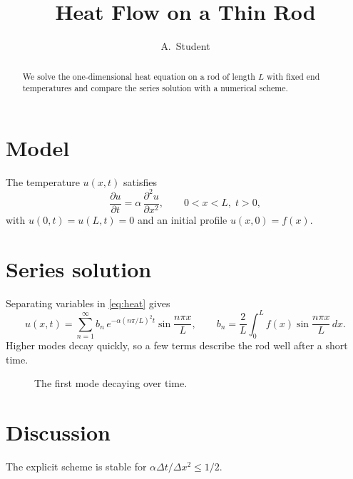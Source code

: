 \documentclass[11pt]{article}
\title{Heat Flow on a Thin Rod}
\author{A.\ Student}
\date{}
\begin{document}
\maketitle

\begin{abstract}
We solve the one-dimensional heat equation on a rod of length $L$ with fixed end temperatures
and compare the series solution with a numerical scheme.
\end{abstract}

\section{Model}
The temperature $u(x,t)$ satisfies
\begin{equation}
  \frac{\partial u}{\partial t} = \alpha \, \frac{\partial^2 u}{\partial x^2},
  \qquad 0 < x < L,\; t > 0,
  \label{eq:heat}
\end{equation}
with $u(0,t) = u(L,t) = 0$ and an initial profile $u(x,0) = f(x)$.

\section{Series solution}
Separating variables in \eqref{eq:heat} gives
\begin{equation}
  u(x,t) = \sum_{n=1}^{\infty} b_n \, e^{-\alpha (n\pi/L)^2 t} \sin\frac{n\pi x}{L},
  \qquad b_n = \frac{2}{L}\int_0^L f(x)\sin\frac{n\pi x}{L}\,dx .
\end{equation}
Higher modes decay quickly, so a few terms describe the rod well after a short time.

\begin{figure}[h]
  \centering
  \caption{The first mode decaying over time.}
\end{figure}

\section{Discussion}
The explicit scheme is stable for $\alpha \Delta t / \Delta x^2 \le 1/2$.
\end{document}
